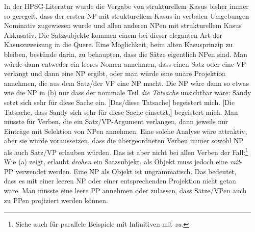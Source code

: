 In der HPSG-Literatur wurde die Vergabe von strukturellem Kasus bisher immer so geregelt, dass der
ersten NP mit strukturellem Kasus in verbalen Umgebungen Nominativ zugewiesen wurde und allen
anderen NPen mit strukturellem Kasus Akkusativ. Die Satzsubjekte kommen einem bei dieser eleganten
Art der Kasuszuweisung in die Quere. Eine Möglichkeit, beim alten Kasusprinzip zu bleiben, bestünde
darin, zu behaupten, dass die Sätze eigentlich NPen sind. Man würde dann entweder ein leeres Nomen
annehmen, dass einen Satz oder eine VP verlangt und dann eine NP ergibt, oder man würde eine unäre
Projektion annehmen, die aus dem Satz/der VP eine NP macht. Die NP wäre dann so etwas wie die NP in
(b) nur dass der nominale Teil \emph{die Tatsache} unsichtbar wäre:
\eal
\ex Sandy setzt sich sehr für diese Sache ein. [Das/diese Tatsache] begeistert mich.
\ex {}[Die Tatsache, dass Sandy sich sehr für diese Sache einsetzt,] begeistert mich.
\zl
Man müsste für Verben, die ein Satz/VP-Argument verlangen, dann jeweils nur Einträge mit Selektion
von NPen annehmen. Eine solche Analyse wäre attraktiv, aber sie würde voraussetzen, dass die übergeordneten Verben
immer sowohl NP als auch Satz/VP erlauben würden. Das ist aber nicht bei allen Verben der
Fall:\footnote{
Siehe auch \citet[235]{Mueller99a} für parallele Beispiele mit Infinitiven mit \emph{zu}.
}
\eal
{}
\zl
Wie (a) zeigt, erlaubt \emph{drohen} ein Satzsubjekt, als Objekt muss jedoch eine
\emph{mit}-PP verwendet werden. Eine NP als Objekt ist ungrammatisch. Das bedeutet, dass es mit
einer leeren NP oder einer entsprechenden Projektion nicht getan wäre. Man müsste eine leere PP
annehmen oder zulassen, dass Sätze/VPen auch zu PPen projiziert werden können. 

